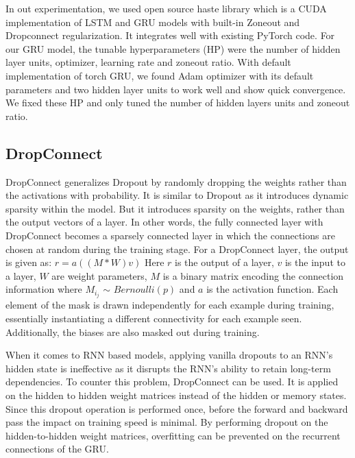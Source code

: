 \documentclass{article}
\begin{document}
In out experimentation, we used open source haste library \cite{haste2020} which is a CUDA implementation of LSTM and GRU models with built-in Zoneout and Dropconnect regularization. It integrates well with existing PyTorch code. For our GRU model, the tunable hyperparameters (HP) were the number of hidden layer units, optimizer, learning rate and zoneout ratio. With default implementation of torch GRU, we found Adam optimizer with its default parameters and two hidden layer units to work well and show quick convergence. We fixed these HP and only tuned the number of hidden layers units and zoneout ratio.

\subsection{DropConnect}
DropConnect generalizes Dropout by randomly dropping the weights rather than the activations with probability. It is similar to Dropout as it introduces dynamic sparsity within the model. But it introduces sparsity on the weights, rather than the output vectors of a layer. In other words, the fully connected layer with DropConnect becomes a sparsely connected layer in which the connections are chosen at random during the training stage. For a DropConnect layer, the output is given as: $r=a((M*W)v)$
Here $r$ is the output of a layer, $v$ is the input to a layer, $W$ are weight parameters, $M$ is a binary matrix encoding the connection information where $M_i_j$ $\sim$ $Bernoulli(p)$ and $a$ is the activation function. Each element of the mask  is drawn independently for each example during training, essentially instantiating a different connectivity for each example seen. Additionally, the biases are also masked out during training.

When it comes to RNN based models, applying vanilla dropouts to an RNN’s hidden state is ineffective as it disrupts the RNN’s ability to retain long-term dependencies. To counter this problem, DropConnect can be used. It is applied on the hidden to hidden weight matrices instead of the hidden or memory states. Since this dropout operation is performed once, before the forward and backward pass the impact on training speed is minimal. By performing dropout on the hidden-to-hidden weight matrices, overfitting can be prevented on the recurrent connections of the GRU.
\end{document}
